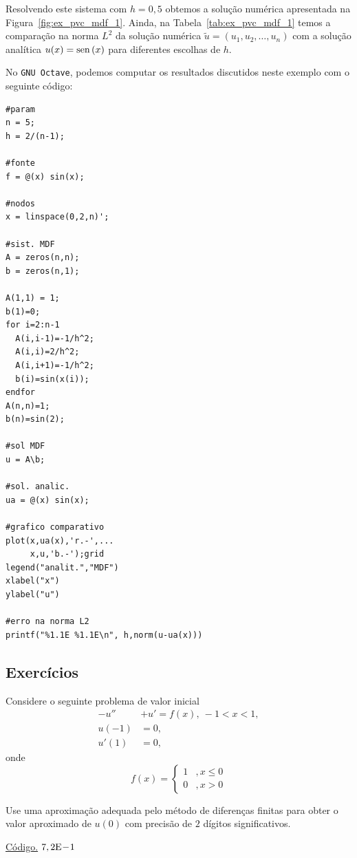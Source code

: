 \begin{ex}
Resolvendo este sistema com $h=0,5$ obtemos a solução numérica apresentada na Figura~\ref{fig:ex_pvc_mdf_1}. Ainda, na Tabela~\ref{tab:ex_pvc_mdf_1} temos a comparação na norma $L^2$ da solução numérica $\tilde{u} = (u_1, u_2, \dotsc, u_n)$ com a solução analítica $u(x)=\operatorname{sen}\,(x)$ para diferentes escolhas de $h$.

\ifisoctave
No \verb+GNU Octave+, podemos computar os resultados discutidos neste exemplo com o seguinte código:
\begin{verbatim}
#param
n = 5;
h = 2/(n-1);

#fonte
f = @(x) sin(x);

#nodos
x = linspace(0,2,n)';

#sist. MDF
A = zeros(n,n);
b = zeros(n,1);

A(1,1) = 1;
b(1)=0;
for i=2:n-1
  A(i,i-1)=-1/h^2;
  A(i,i)=2/h^2;
  A(i,i+1)=-1/h^2;
  b(i)=sin(x(i));
endfor
A(n,n)=1;
b(n)=sin(2);

#sol MDF
u = A\b;

#sol. analic.
ua = @(x) sin(x);

#grafico comparativo
plot(x,ua(x),'r.-',...
     x,u,'b.-');grid
legend("analit.","MDF")
xlabel("x")
ylabel("u")

#erro na norma L2
printf("%1.1E %1.1E\n", h,norm(u-ua(x)))
\end{verbatim}
\fi
\end{ex}

\subsection*{Exercícios}

\begin{exer}
Considere o seguinte problema de valor inicial
  \begin{align}
    -u'' &+ u' = f(x),~-1<x<1,\\
    u(-1)&=0,\\
    u'(1)&=0,
  \end{align}
  onde
  \begin{equation}
    f(x) = \left\{
      \begin{array}{ll}
        1 &, x\leq 0\\
        0 &, x>0
      \end{array}
    \right.
  \end{equation}
\end{exer}
Use uma aproximação adequada pelo método de diferenças finitas para obter o valor aproximado de $u(0)$ com precisão de $2$ dígitos significativos.
\begin{resp}
  \ifisoctave 
  \href{https://github.com/phkonzen/notas/blob/master/src/MatematicaNumerica/cap_pvc/dados/exer_pvc_mdf_1/exer_pvc_mdf_1.m}{Código.} 
  \fi
  $7,2\mathrm{E}\!-\!1$
\end{resp}
